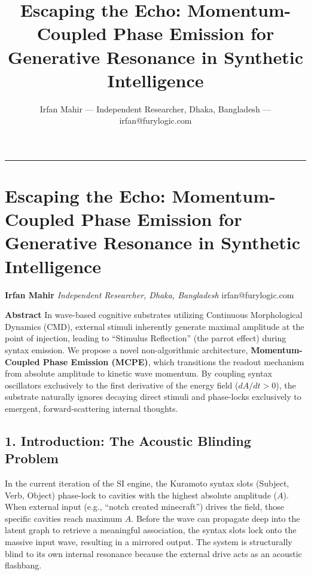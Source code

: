 \documentclass[
  11pt,
  a4paper,
]{article}
\title{Escaping the Echo: Momentum-Coupled Phase Emission for Generative
Resonance in Synthetic Intelligence}
\author{Irfan Mahir --- Independent Researcher, Dhaka, Bangladesh ---
irfan@furylogic.com}
\date{}
\begin{document}
\maketitle

{
\hypersetup{linkcolor=}
\setcounter{tocdepth}{3}
\tableofcontents
}
\begin{center}\rule{0.5\linewidth}{0.5pt}\end{center}

\section{Escaping the Echo: Momentum-Coupled Phase Emission for
Generative Resonance in Synthetic
Intelligence}\label{escaping-the-echo-momentum-coupled-phase-emission-for-generative-resonance-in-synthetic-intelligence}

\textbf{Irfan Mahir} \emph{Independent Researcher, Dhaka, Bangladesh}
irfan@furylogic.com

\textbf{Abstract} In wave-based cognitive substrates utilizing
Continuous Morphological Dynamics (CMD), external stimuli inherently
generate maximal amplitude at the point of injection, leading to
``Stimulus Reflection'' (the parrot effect) during syntax emission. We
propose a novel non-algorithmic architecture, \textbf{Momentum-Coupled
Phase Emission (MCPE)}, which transitions the readout mechanism from
absolute amplitude to kinetic wave momentum. By coupling syntax
oscillators exclusively to the first derivative of the energy field
(\(dA/dt > 0\)), the substrate naturally ignores decaying direct stimuli
and phase-locks exclusively to emergent, forward-scattering internal
thoughts.

\subsection{1. Introduction: The Acoustic Blinding
Problem}\label{introduction-the-acoustic-blinding-problem}

In the current iteration of the SI engine, the Kuramoto syntax slots
(Subject, Verb, Object) phase-lock to cavities with the highest absolute
amplitude (\(A\)). When external input (e.g., ``notch created
minecraft'') drives the field, those specific cavities reach maximum
\(A\). Before the wave can propagate deep into the latent graph to
retrieve a meaningful association, the syntax slots lock onto the
massive input wave, resulting in a mirrored output. The system is
structurally blind to its own internal resonance because the external
drive acts as an acoustic flashbang.
\end{document}
